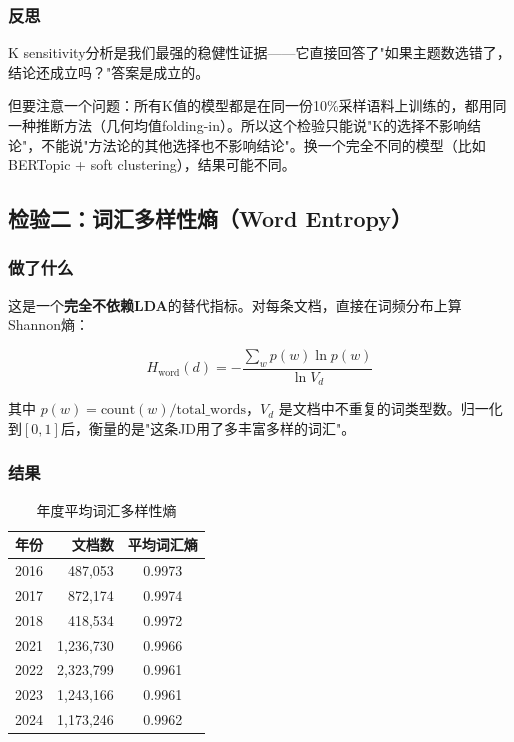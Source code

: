\documentclass[12pt,a4paper]{ctexart}
\begin{document}
\subsubsection{反思}

K sensitivity分析是我们最强的稳健性证据——它直接回答了"如果主题数选错了，结论还成立吗？"答案是成立的。

但要注意一个问题：所有K值的模型都是在同一份10\%采样语料上训练的，都用同一种推断方法（几何均值folding-in）。所以这个检验只能说"K的选择不影响结论"，不能说"方法论的其他选择也不影响结论"。换一个完全不同的模型（比如BERTopic + soft clustering），结果可能不同。

\subsection{检验二：词汇多样性熵（Word Entropy）}

\subsubsection{做了什么}

这是一个\textbf{完全不依赖LDA}的替代指标。对每条文档，直接在词频分布上算Shannon熵：

\begin{equation}
H_{\text{word}}(d) = -\frac{\sum_{w} p(w) \ln p(w)}{\ln V_d}
\end{equation}

其中 $p(w) = \text{count}(w) / \text{total\_words}$，$V_d$ 是文档中不重复的词类型数。归一化到$[0,1]$后，衡量的是"这条JD用了多丰富多样的词汇"。

\subsubsection{结果}

\begin{table}[h]
\centering
\begin{tabular}{lrc}
\toprule
年份 & 文档数 & 平均词汇熵 \\
\midrule
2016 & 487,053 & 0.9973 \\
2017 & 872,174 & 0.9974 \\
2018 & 418,534 & 0.9972 \\
2021 & 1,236,730 & 0.9966 \\
2022 & 2,323,799 & 0.9961 \\
2023 & 1,243,166 & 0.9961 \\
2024 & 1,173,246 & 0.9962 \\
\bottomrule
\end{tabular}
\caption{年度平均词汇多样性熵}
\label{tab:word-entropy}
\end{table}
\end{document}
